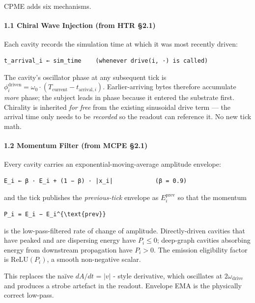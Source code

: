 \documentclass[
  11pt,
  a4paper,
]{article}
\begin{document}
CPME adds six mechanisms.

\paragraph{1.1 Chiral Wave Injection (from HTR
§2.1)}\label{chiral-wave-injection-from-htr-2.1}

Each cavity records the simulation time at which it was most recently
driven:

\begin{verbatim}
t_arrival_i ← sim_time    (whenever drive(i, ·) is called)
\end{verbatim}

The cavity's oscillator phase at any subsequent tick is
\(\phi_i^{\text{driven}} = \omega_0 \cdot (T_{\text{current}} - t_{\text{arrival}, i})\).
Earlier-arriving bytes therefore accumulate \emph{more} phase; the
subject leads in phase because it entered the substrate first. Chirality
is inherited \emph{for free} from the existing sinusoidal drive term ---
the arrival time only needs to be \emph{recorded} so the readout can
reference it. No new tick math.

\paragraph{1.2 Momentum Filter (from MCPE
§2.1)}\label{momentum-filter-from-mcpe-2.1}

Every cavity carries an exponential-moving-average amplitude envelope:

\begin{verbatim}
E_i ← β · E_i + (1 − β) · |x_i|            (β = 0.9)
\end{verbatim}

and the tick publishes the \emph{previous-tick} envelope as
\(E_i^{\text{prev}}\) so that the momentum

\begin{verbatim}
P_i = E_i − E_i^{\text{prev}}
\end{verbatim}

is the low-pass-filtered rate of change of amplitude. Directly-driven
cavities that have peaked and are dispersing energy have \(P_i \le 0\);
deep-graph cavities absorbing energy from downstream propagation have
\(P_i > 0\). The emission eligibility factor is \(\text{ReLU}(P_i)\), a
smooth non-negative scalar.

This replaces the naïve \(dA/dt\) = \(|v|\) - style derivative, which
oscillates at \(2\omega_{\text{drive}}\) and produces a strobe artefact
in the readout. Envelope EMA is the physically correct low-pass.
\end{document}
